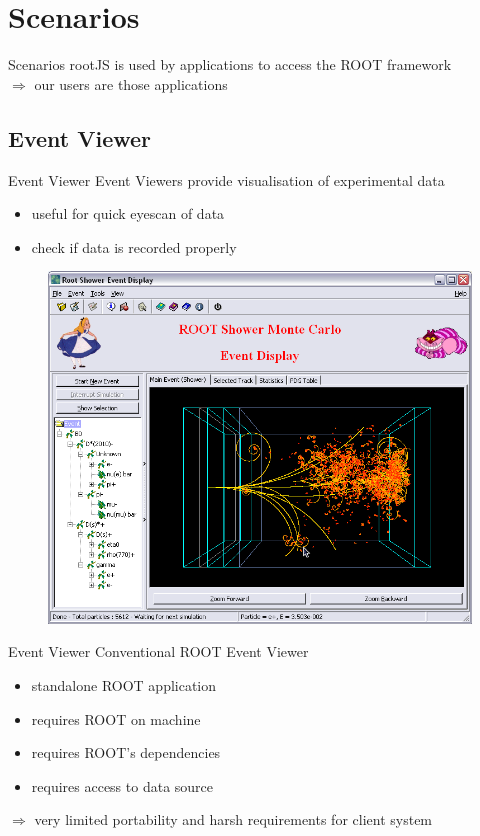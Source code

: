 \section{Scenarios}
\begin{frame}{Scenarios}
rootJS is used by applications to access the ROOT framework\\
\pause $\Rightarrow $ our users are those applications
\end{frame}

\subsection{Event Viewer}
\begin{frame}{Event Viewer}
 \pause   Event Viewers provide visualisation of experimental data
  \begin{itemize}
    \pause \item useful for quick eyescan of data
    \pause \item check if data is recorded properly
  \end{itemize}
  \pause
  \medskip
   \begin{figure}[htb]
      \includegraphics[width=0.6\linewidth, keepaspectratio]{./resources/shower_event_viewer.png}
      \nocite{cern:root:eventviewer}
   \end{figure}
   \end{frame}

\begin{frame}{Event Viewer}
   Conventional ROOT Event Viewer
  \begin{itemize}
  \pause \item standalone ROOT application
   \pause \item requires ROOT on machine
   \pause \item requires ROOT's dependencies
   \pause \item requires access to data source
   \end{itemize}
   \pause $\Rightarrow $ very limited portability and harsh requirements for client system
\end{frame}

